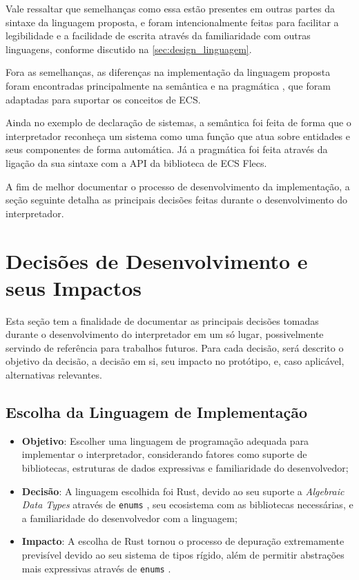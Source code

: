 Vale ressaltar que semelhanças como essa estão presentes em outras partes da sintaxe da linguagem proposta, e foram intencionalmente feitas para facilitar a legibilidade e a facilidade de escrita através da familiaridade com outras linguagens, conforme discutido na \autoref{sec:design_linguagem}.

Fora as semelhanças, as diferenças na implementação da linguagem proposta foram encontradas principalmente na semântica e na pragmática \cite{designconceptsinlanguages}, que foram adaptadas para suportar os conceitos de ECS.

Ainda no exemplo de declaração de sistemas, a semântica foi feita de forma que o interpretador reconheça um sistema como uma função que atua sobre entidades e seus componentes de forma automática. Já a pragmática foi feita através da ligação da sua sintaxe com a API da biblioteca de ECS Flecs.

A fim de melhor documentar o processo de desenvolvimento da implementação, a seção seguinte detalha as principais decisões feitas durante o desenvolvimento do interpretador.

\section{Decisões de Desenvolvimento e seus Impactos}

Esta seção tem a finalidade de documentar as principais decisões tomadas durante o desenvolvimento do interpretador em um só lugar, possivelmente servindo de referência para trabalhos futuros. Para cada decisão, será descrito o objetivo da decisão, a decisão em si, seu impacto no protótipo, e, caso aplicável, alternativas relevantes.

\subsection{Escolha da Linguagem de Implementação}

\begin{itemize}
	\item \textbf{Objetivo}: Escolher uma linguagem de programação adequada para implementar o interpretador, considerando fatores como suporte de bibliotecas, estruturas de dados expressivas e familiaridade do desenvolvedor;
	\item \textbf{Decisão}: A linguagem escolhida foi Rust, devido ao seu suporte a \textit{Algebraic Data Types} através de \texttt{enums} \cite{rustbook}, seu ecosistema com as bibliotecas necessárias, e a familiaridade do desenvolvedor com a linguagem;
	\item \textbf{Impacto}: A escolha de Rust tornou o processo de depuração extremamente previsível devido ao seu sistema de tipos rígido, além de permitir abstrações mais expressivas através de \texttt{enums} \cite{rustbook}.
\end{itemize}

